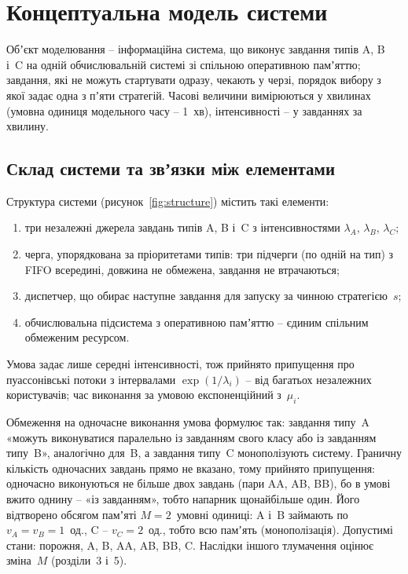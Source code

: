 \section{Концептуальна модель системи}

Обʼєкт моделювання -- інформаційна система, що виконує завдання типів A, B і~C на одній
обчислювальній системі зі спільною оперативною памʼяттю; завдання, які не можуть стартувати одразу,
чекають у черзі, порядок вибору з якої задає одна з пʼяти стратегій. Часові величини вимірюються у хвилинах (умовна одиниця модельного часу -- 1~хв),
інтенсивності -- у завданнях за хвилину.

\subsection{Склад системи та звʼязки між елементами}

Структура системи (рисунок~\ref{fig:structure}) містить такі елементи:
\begin{enumerate}
  \item три незалежні джерела завдань типів A, B і~C з інтенсивностями $\lambda_A$, $\lambda_B$, $\lambda_C$;
  \item черга, упорядкована за пріоритетами типів: три підчерги (по одній на тип) з FIFO
        всередині, довжина не обмежена, завдання не втрачаються;
  \item диспетчер, що обирає наступне завдання для запуску за чинною стратегією~$s$;
  \item обчислювальна підсистема з оперативною памʼяттю -- єдиним спільним обмеженим ресурсом.
\end{enumerate}

Умова задає лише середні інтенсивності, тож прийнято припущення про пуассонівські потоки з
інтервалами $\exp(1/\lambda_i)$ -- від багатьох незалежних користувачів; час виконання за умовою
експоненційний з~$\mu_i$.

Обмеження на одночасне виконання умова формулює так: завдання типу~A «можуть виконуватися
паралельно із завданням свого класу або із завданням типу~B», аналогічно для~B, а завдання
типу~C монополізують систему. Граничну кількість одночасних завдань прямо не вказано, тому
прийнято припущення: одночасно виконуються не більше двох завдань (пари AA, AB, BB), бо
в умові вжито однину -- «із завданням», тобто напарник щонайбільше один. Його відтворено обсягом
памʼяті $M=2$~умовні одиниці: A і~B займають по $v_A=v_B=1$~од., C -- $v_C=2$~од., тобто всю
памʼять (монополізація). Допустимі стани: порожня, A, B, AA, AB, BB, C. Наслідки іншого
тлумачення оцінює зміна~$M$ (розділи~3 і~5).

